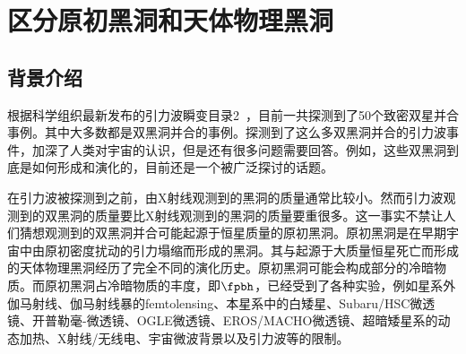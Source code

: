 \chapter{区分原初黑洞和天体物理黑洞}\label{chap:distinguish}


\section{背景介绍}
根据\lvc 科学组织最新发布的引力波瞬变目录2~\cite{Abbott:2020niy}，目前一共探测到了50个致密双星并合事例。其中大多数都是双黑洞并合的事例。探测到了这么多双黑洞并合的引力波事件，加深了人类对宇宙的认识，但是还有很多问题需要回答。例如，这些双黑洞到底是如何形成和演化的，目前还是一个被广泛探讨的话题\cite{Bird:2016dcv,Sasaki:2016jop,Chen:2018czv,Clesse:2017bsw,Fishbach:2017dwv,Clesse:2016vqa,Antonini:2016gqe,Inayoshi:2017mrs,Ali-Haimoud:2017rtz,Perna:2019axr,Kavanagh:2018ggo,Rodriguez:2015oxa,Rodriguez:2016kxx,Park:2017zgj,Wu:2020drm,Belczynski:2014iua,Belczynski:2016obo,Woosley:2016nnw,Rodriguez:2018rmd,Choksi:2018jnq,2010AIPC.1314..291D,deMink:2016vkw}。

在引力波被探测到之前，由X射线观测到的黑洞的质量通常比较小\cite{Wiktorowicz:2013dua,Casares:2013tpa,Corral-Santana:2013uua,Corral-Santana:2015fud}。然而引力波观测到的双黑洞的质量要比X射线观测到的黑洞的质量要重很多。这一事实不禁让人们猜想观测到的双黑洞并合可能起源于恒星质量的原初黑洞\cite{Bird:2016dcv,Sasaki:2016jop,Chen:2018czv,Clesse:2017bsw}。原初黑洞是在早期宇宙中由原初密度扰动的引力塌缩而形成的黑洞\cite{Hawking:1971ei,Carr:1974nx,Khlopov:2008qy,Sasaki:2018dmp}。其与起源于大质量恒星死亡而形成的天体物理黑洞经历了完全不同的演化历史。原初黑洞可能会构成部分的冷暗物质。而原初黑洞占冷暗物质的丰度，即$\fpbh$，已经受到了各种实验，例如星系外伽马射线\cite{Carr:2009jm}、伽马射线暴的femtolensing\cite{Barnacka:2012bm}、本星系中的白矮星\cite{Graham:2015apa}、Subaru/HSC微透镜\cite{Niikura:2017zjd}、开普勒毫-微透镜\cite{Griest:2013esa}、OGLE微透镜\cite{Niikura:2019kqi}、EROS/MACHO微透镜\cite{Tisserand:2006zx,Calcino:2018mwh}、超暗矮星系的动态加热\cite{Brandt:2016aco}、X射线/无线电\cite{Gaggero:2016dpq}、宇宙微波背景\cite{Ali-Haimoud:2016mbv,Blum:2016cjs,Horowitz:2016lib,Chen:2016pud,Poulin:2017bwe}以及引力波\cite{Wang:2016ana,Abbott:2018oah,Authors:2019qbw,Magee:2018opb,Wang:2019kaf,Chen:2019xse,Yuan:2019udt,Chen:2018rzo}等的限制。

